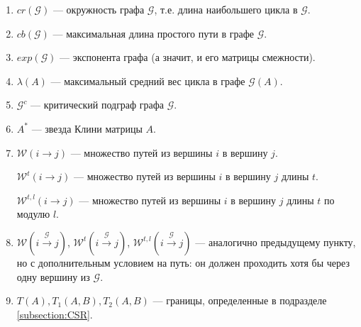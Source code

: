 \documentclass[12pt]{article}
\begin{document}
\begin{enumerate}
    \item $cr(\mathcal{G})$ --- окружность графа $\mathcal{G}$, т.е. длина наибольшего цикла в $\mathcal{G}$.

	\item $cb(\mathcal{G})$ --- максимальная длина простого пути в графе $\mathcal{G}$.
    
    \item $exp(\mathcal{G})$ --- экспонента графа (а значит, и его матрицы смежности).
    
    \item $\lambda(A)$ --- максимальный средний вес цикла в графе $\mathcal{G}(A)$.
    
    \item $\mathcal{G}^c$ --- критический подграф графа $\mathcal{G}$.
    
    \item $A^*$ --- звезда Клини матрицы $A$.
    
    \item $\mathcal{W}(i \rightarrow j)$ --- множество путей из вершины $i$ в вершину $j$.
    
    $\mathcal{W}^t(i \rightarrow j)$ --- множество путей из вершины $i$ в вершину $j$ длины $t$.
    
    $\mathcal{W}^{t, l}(i \rightarrow j)$ --- множество путей из вершины $i$ в вершину $j$ длины $t$ по модулю $l$.
    
    \item $\mathcal{W}(i \xrightarrow{\mathcal{G}} j)$, $\mathcal{W}^t(i \xrightarrow{\mathcal{G}} j)$, $\mathcal{W}^{t, l}(i \xrightarrow{\mathcal{G}} j)$ --- аналогично предыдущему пункту, но с дополнительным условием на путь: он должен проходить хотя бы через одну вершину из $\mathcal{G}$.
    
    \item $T(A), T_1(A, B), T_2(A, B)$ --- границы, определенные в подразделе \ref{subsection:CSR}.
\end{enumerate}
\end{document}
